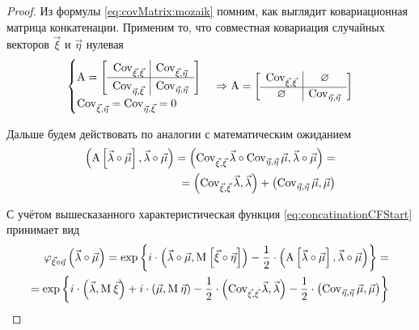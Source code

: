 \begin{proof}
  Из формулы \eqref{eq:covMatrix:mozaik} помним, как выглядит ковариационная
  матрица конкатенации. Применим то, что совместная
  ковариация случайных векторов $\vec{\xi}$ и $\vec{\eta}$ нулевая
  $$\begin{cases}
      \operatorname{A}
      = \left[ \begin{array}{r|l}
          \operatorname{Cov}^{}_{\vec{\xi}, \vec{\xi}} & \operatorname{Cov}^{}_{\vec{\xi}, \vec{\eta}} \\
          \hline
          \operatorname{Cov}^{}_{\vec{\eta}, \vec{\xi}} & \operatorname{Cov}^{}_{\vec{\eta}, \vec{\eta}} \\
      \end{array} \right] \\
      \operatorname{Cov}^{}_{\vec{\xi}, \vec{\eta}} = \operatorname{Cov}^{}_{\vec{\eta}, \vec{\xi}} = 0
      \end{cases}
      \Rightarrow
      \operatorname{A}
      = \left[ \begin{array}{c|c}
          \operatorname{Cov}^{}_{\vec{\xi}, \vec{\xi}} & \varnothing \\
          \hline
          \varnothing & \operatorname{Cov}^{}_{\vec{\eta}, \vec{\eta}} \\
      \end{array} \right]$$

  Дальше будем действовать по аналогии с математическим ожиданием
  \begin{align*}
      \left( \operatorname{A} \left[ \vec{\lambda} \circ \vec{\mu} \right],
      \vec{\lambda} \circ \vec{\mu} \right)
      = \left( \operatorname{Cov}^{}_{\vec{\xi}, \vec{\xi}} \vec{\lambda}
          \circ \operatorname{Cov}^{}_{\vec{\eta}, \vec{\eta}} \vec{\mu},
      \vec{\lambda} \circ \vec{\mu} \right) = \\
      = \left( \operatorname{Cov}^{}_{\vec{\xi}, \vec{\xi}} \vec{\lambda}, \vec{\lambda} \right)
      + \left( \operatorname{Cov}^{}_{\vec{\eta}, \vec{\eta}} \vec{\mu}, \vec{\mu} \right)
  \end{align*}

  С учётом вышесказанного характеристическая функция
  \eqref{eq:concatinationCFStart} принимает вид
  \begin{align*}
      \varphi_{\vec{\xi} \circ \vec{\eta}}\left(
      \vec{\lambda} \circ \vec{\mu} \right)
      = \exp{\left\{
          i \cdot \left( \vec{\lambda} \circ \vec{\mu},
        \operatorname{M}_{} \left[ \vec{\xi} \circ \vec{\eta} \right] \right)
          - \frac{1}{2} \cdot \left( \operatorname{A}
        \left[ \vec{\lambda} \circ \vec{\mu} \right],
        \vec{\lambda} \circ \vec{\mu} \right)
      \right\}} = \\
      = \exp{\left\{ 
      i \cdot \left( \vec{\lambda}, \operatorname{M}_{} \vec{\xi} \right)
          + i \cdot \left( \vec{\mu}, \operatorname{M}_{} \vec{\eta} \right)
          - \frac{1}{2} \cdot
        \left( \operatorname{Cov}^{}_{\vec{\xi}, \vec{\xi}} \vec{\lambda}, \vec{\lambda} \right)
          - \frac{1}{2} \cdot
        \left( \operatorname{Cov}^{}_{\vec{\eta}, \vec{\eta}} \vec{\mu}, \vec{\mu} \right)
          \right\}}
  \end{align*}


\end{proof}
